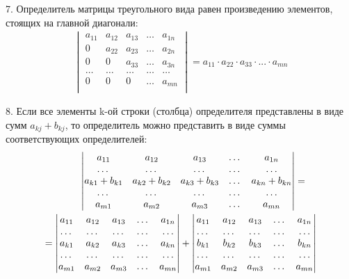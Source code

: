 \documentclass[a4paper,12pt]{extbook}
\theoremstyle{named}
\theoremstyle{named}
\begin{document}
7. Определитель матрицы треугольного вида равен произведению элементов, стоящих на главной диагонали:
\begin{gather*}
    \begin{vmatrix}
        a_{11} & a_{12} & a_{13} & \dots & a_{1n} \\
        0      & a_{22} & a_{23} & \dots & a_{2n} \\
        0      & 0      & a_{33} & \dots & a_{3n} \\
        \dots  & \dots  & \dots  & \dots & \dots  \\
        0      & 0      & 0      & \dots & a_{mn} \\
    \end{vmatrix}
    = a_{11} \cdot a_{22} \cdot a_{33} \cdot ... \cdot a_{mn}
\end{gather*}

8. Если все элементы k-ой строки (столбца) определителя представлены в виде сумм \(a_{kj} + b_{kj}\), то определитель можно представить в виде суммы соответствующих определителей:
\begin{gather*}
    \hspace{0.9cm}
    \begin{vmatrix}
        a_{11}          & a_{12}          & a_{13}          & \dots & a_{1n}          \\
        \dots           & \dots           & \dots           & \dots & \dots           \\
        a_{k1} + b_{k1} & a_{k2} + b_{k2} & a_{k3} + b_{k3} & \dots & a_{kn} + b_{kn} \\
        \dots           & \dots           & \dots           & \dots & \dots           \\
        a_{m1}          & a_{m2}          & a_{m3}          & \dots & a_{mn}          \\
    \end{vmatrix}
    =
    \\
    =
    \begin{vmatrix}
        a_{11} & a_{12} & a_{13} & \dots & a_{1n} \\
        \dots  & \dots  & \dots  & \dots & \dots  \\
        a_{k1} & a_{k2} & a_{k3} & \dots & a_{kn} \\
        \dots  & \dots  & \dots  & \dots & \dots  \\
        a_{m1} & a_{m2} & a_{m3} & \dots & a_{mn} \\
    \end{vmatrix}
    +
    \begin{vmatrix}
        a_{11} & a_{12} & a_{13} & \dots & a_{1n} \\
        \dots  & \dots  & \dots  & \dots & \dots  \\
        b_{k1} & b_{k2} & b_{k3} & \dots & b_{kn} \\
        \dots  & \dots  & \dots  & \dots & \dots  \\
        a_{m1} & a_{m2} & a_{m3} & \dots & a_{mn} \\
    \end{vmatrix}
\end{gather*}
\end{document}
